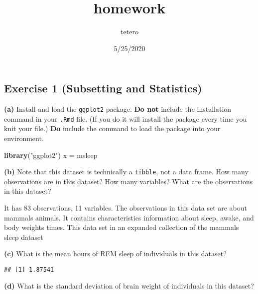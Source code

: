 \documentclass[]{article}
\title{homework}
\author{tetero}
\date{5/25/2020}
\newenvironment{Shaded}{\begin{snugshade}}{\end{snugshade}}
\newcommand{\DataTypeTok}[1]{\textcolor[rgb]{0.13,0.29,0.53}{#1}}
\newcommand{\KeywordTok}[1]{\textcolor[rgb]{0.13,0.29,0.53}{\textbf{#1}}}
\newcommand{\NormalTok}[1]{#1}
\newcommand{\OperatorTok}[1]{\textcolor[rgb]{0.81,0.36,0.00}{\textbf{#1}}}
\newcommand{\OtherTok}[1]{\textcolor[rgb]{0.56,0.35,0.01}{#1}}
\newcommand{\StringTok}[1]{\textcolor[rgb]{0.31,0.60,0.02}{#1}}
\begin{document}
\maketitle

\hypertarget{exercise-1-subsetting-and-statistics}{%
\subsection{Exercise 1 (Subsetting and
Statistics)}\label{exercise-1-subsetting-and-statistics}}

\textbf{(a)} Install and load the \texttt{ggplot2} package. \textbf{Do
not} include the installation command in your \texttt{.Rmd} file. (If
you do it will install the package every time you knit your file.)
\textbf{Do} include the command to load the package into your
environment.

\begin{Shaded}
\begin{Highlighting}[]
\KeywordTok{library}\NormalTok{(}\StringTok{"ggplot2"}\NormalTok{)}
\NormalTok{x =}\StringTok{ }\NormalTok{msleep}
\end{Highlighting}
\end{Shaded}

\textbf{(b)} Note that this dataset is technically a \texttt{tibble},
not a data frame. How many observations are in this dataset? How many
variables? What are the observations in this dataset?

It has 83 observations, 11 variables. The observations in this data set
are about mammals animals. It contains characteristics information about
sleep, awake, and body weights times. This data set in an expanded
collection of the mammals sleep dataset

\textbf{(c)} What is the mean hours of REM sleep of individuals in this
dataset?

\begin{Shaded}
\end{Shaded}

\begin{verbatim}
## [1] 1.87541
\end{verbatim}

\textbf{(d)} What is the standard deviation of brain weight of
individuals in this dataset?
\end{document}
